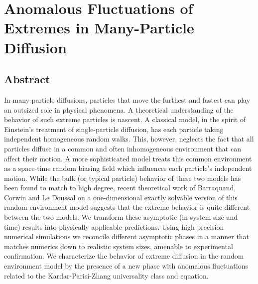 \def\maxnt{\mathrm{Max}^{N}_t}
\def\envnt{\mathrm{Env}^{N}_t}
\def\snt{\mathrm{Sam}^{N}_t}


\chapter{Anomalous Fluctuations of Extremes in Many-Particle Diffusion}
\label{ch2_1Drandom}

\section{Abstract}
In many-particle diffusions, particles that move the furthest and fastest can play an outsized role in physical phenomena. A theoretical understanding of the behavior of such extreme particles is nascent. A classical model, in the spirit of Einstein's  treatment of single-particle diffusion, has each particle taking independent homogeneous random walks. This, however, neglects the fact that all particles diffuse in a common and often inhomogeneous environment that can affect their motion. A more sophisticated model treats this common environment as a space-time random biasing field which influences each particle's independent motion. While the bulk (or typical particle) behavior of these two models has been found to match to high degree, recent theoretical work of Barraquand, Corwin and Le Doussal on a one-dimensional exactly solvable version of this random environment model suggests that the extreme behavior is quite different between the two models. We transform these asymptotic (in system size and time) results into physically applicable predictions. Using high precision numerical simulations we reconcile different asymptotic phases in a manner that matches numerics down to realistic system sizes, amenable to experimental confirmation. We characterize the behavior of extreme diffusion in the random environment model by the presence of a new phase with anomalous fluctuations related to the Kardar-Parisi-Zhang universality class and equation.

